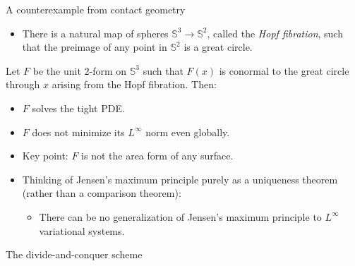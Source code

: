 \documentclass[10pt]{beamer}
\begin{document}
\begin{frame}{A counterexample from contact geometry}
    \begin{itemize}
        \item There is a natural map of spheres $\mathbb S^3 \to \mathbb S^2$, called the \emph{Hopf fibration}, such that the preimage of any point in $\mathbb S^2$ is a great circle. 
    \end{itemize}

    \begin{example}[B '24]
    Let $F$ be the unit $2$-form on $\mathbb S^3$ such that $F(x)$ is conormal to the great circle through $x$ arising from the Hopf fibration.
    Then: 
\begin{itemize}
    \item $F$ solves the tight PDE.  
    \item $F$ does not minimize its $L^\infty$ norm even globally.
\end{itemize}
\end{example}

\begin{itemize}
\item Key point: $F$ is not the area form of any surface.  
\item Thinking of Jensen's maximum principle purely as a uniqueness theorem (rather than a comparison theorem):  
\begin{itemize}
\item There can be no generalization of Jensen's maximum principle to $L^\infty$ variational systems.
\end{itemize}
\end{itemize}
\end{frame}

\begin{frame}{The divide-and-conquer scheme}
    
\end{frame}
\end{document}
